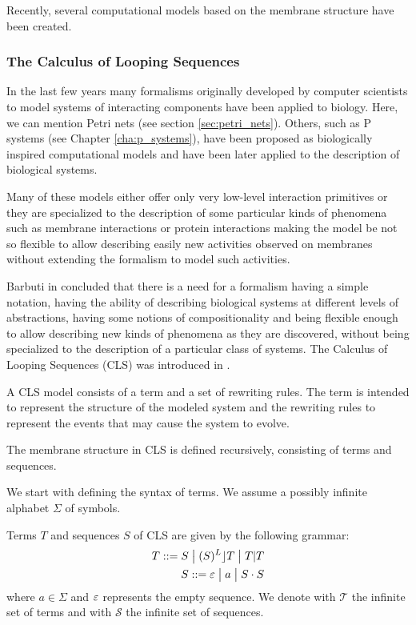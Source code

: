 
Recently, several computational models based on the membrane structure have been created.


\subsubsection{The Calculus of Looping Sequences} %
\label{subs:calculus_of_looping_sequences}

In the last few years many formalisms originally developed by computer scientists to model systems of interacting components have been applied to biology. Here, we can mention Petri nets (see section \ref{sec:petri_nets}). Others, such as P systems (see Chapter \ref{cha:p_systems}), have been proposed as biologically inspired computational models and have been later applied to the description of biological systems.

Many of these models either offer only very low-level interaction primitives or they are specialized to the description of some particular kinds of phenomena such as membrane interactions or protein interactions making the model be not so flexible to allow describing easily new activities observed on membranes without extending the formalism to model such activities.

Barbuti in \cite{Barbuti07CLS} concluded that there is a need for a formalism having a simple notation, having the ability of describing biological systems at different levels of abstractions, having some notions of compositionality and being flexible enough to allow describing new kinds of phenomena as they are discovered, without being specialized to the description of a particular class of systems. The  Calculus of Looping Sequences (CLS) was introduced in \cite{Barbuti07CLS}.

A CLS model consists of a term and a set of rewriting rules. The term is intended to represent the structure of the modeled system and the rewriting rules to represent the events that may cause the system to evolve.

The membrane structure in CLS is defined recursively, consisting of terms and sequences.

We start with defining the syntax of terms. We assume a possibly infinite alphabet $\Sigma$ of symbols.

\begin{definition}
  Terms $T$ and sequences $S$ of CLS are given by the following grammar:
  \begin{align*}
    T ::= S \;\big|\; (S)^L\rfloor T \;\big|\; T|T\\
    S ::= \varepsilon \;\big|\; a \;\big|\; S\cdot S
  \end{align*}
  where $a\in \Sigma$ and $\varepsilon$ represents the empty sequence. We denote with $\mathcal T$ the infinite set of terms and with $\mathcal S$ the infinite set of sequences.
\end{definition}

